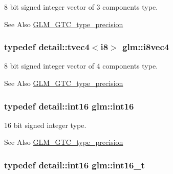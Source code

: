 8 bit signed integer vector of 3 components type. 

\begin{DoxySeeAlso}{See Also}
\hyperlink{group__gtc__type__precision}{G\-L\-M\-\_\-\-G\-T\-C\-\_\-type\-\_\-precision} 
\end{DoxySeeAlso}
\hypertarget{group__gtc__type__precision_gad65f6cda14cdf79b2e8afe6ec8ab3725}{
\subsubsection[{i8vec4}]{\setlength{\rightskip}{0pt plus 5cm}typedef detail\-::tvec4$<$i8$>$ {\bf glm\-::i8vec4}}}\label{group__gtc__type__precision_gad65f6cda14cdf79b2e8afe6ec8ab3725}


8 bit signed integer vector of 4 components type. 

\begin{DoxySeeAlso}{See Also}
\hyperlink{group__gtc__type__precision}{G\-L\-M\-\_\-\-G\-T\-C\-\_\-type\-\_\-precision} 
\end{DoxySeeAlso}
\hypertarget{group__gtc__type__precision_ga2945a61d12771f8954994fcddf02b021}{
\subsubsection[{int16}]{\setlength{\rightskip}{0pt plus 5cm}typedef detail\-::int16 {\bf glm\-::int16}}}\label{group__gtc__type__precision_ga2945a61d12771f8954994fcddf02b021}


16 bit signed integer type. 

\begin{DoxySeeAlso}{See Also}
\hyperlink{group__gtc__type__precision}{G\-L\-M\-\_\-\-G\-T\-C\-\_\-type\-\_\-precision} 
\end{DoxySeeAlso}
\hypertarget{group__gtc__type__precision_gaf89ee61e0d34aa4a462104b7ae7f2da6}{
\subsubsection[{int16\-\_\-t}]{\setlength{\rightskip}{0pt plus 5cm}typedef detail\-::int16 {\bf glm\-::int16\-\_\-t}}}\label{group__gtc__type__precision_gaf89ee61e0d34aa4a462104b7ae7f2da6}


